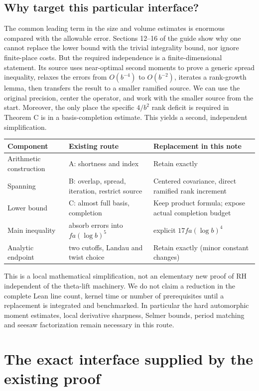 \documentclass[11pt]{article}
\theoremstyle{remark}\newtheorem{remark}[theorem]{Remark}
\begin{document}
\subsection{Why target this particular interface?}
The common leading term in the size and volume estimates is enormous compared with the allowable error. Sections 12--16 of the guide show why one cannot replace the lower bound with the trivial integrality bound, nor ignore finite-place costs. But the required independence is a finite-dimensional statement. Its source uses near-optimal second moments to prove a generic spread inequality, relaxes the errors from $O(b^{-4})$ to $O(b^{-2})$, iterates a rank-growth lemma, then transfers the result to a smaller ramified source. We can use the original precision, center the operator, and work with the smaller source from the start. Moreover, the only place the specific $4/b^2$ rank deficit is required in Theorem C is in a basis-completion estimate. This yields a second, independent simplification.

\begin{center}
\begin{tabularx}{\linewidth}{@{}p{.29\linewidth}XX@{}}
\toprule
Component & Existing route & Replacement in this note\\\midrule
Arithmetic construction & A: shortness and index & Retain exactly\\
Spanning & B: overlap, spread, iteration, restrict source & Centered covariance, direct ramified rank increment\\
Lower bound & C: almost full basis, completion & Keep product formula; expose actual completion budget\\
Main inequality & absorb errors into $fa(\log b)^5$ & explicit $17fa(\log b)^4$\\
Analytic endpoint & two cutoffs, Landau and twist choice & Retain exactly (minor constant changes)\\\bottomrule
\end{tabularx}
\end{center}
This is a local mathematical simplification, not an elementary new proof of RH independent of the theta-lift machinery. We do not claim a reduction in the complete Lean line count, kernel time or number of prerequisites until a replacement is integrated and benchmarked. In particular the hard automorphic moment estimates, local derivative sharpness, Selmer bounds, period matching and seesaw factorization remain necessary in this route.

\section{The exact interface supplied by the existing proof}
\end{document}
